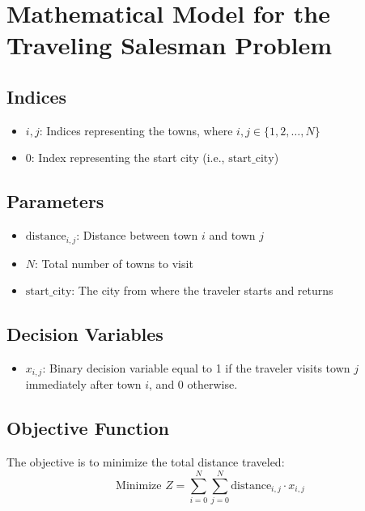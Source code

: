 \documentclass{article}
\begin{document}
\section*{Mathematical Model for the Traveling Salesman Problem}

\subsection*{Indices}
\begin{itemize}
    \item \( i, j \): Indices representing the towns, where \( i, j \in \{1, 2, \ldots, N\} \)
    \item \( 0 \): Index representing the start city (i.e., \( \text{start\_city} \))
\end{itemize}

\subsection*{Parameters}
\begin{itemize}
    \item \( \text{distance}_{i,j} \): Distance between town \( i \) and town \( j \)
    \item \( N \): Total number of towns to visit
    \item \( \text{start\_city} \): The city from where the traveler starts and returns
\end{itemize}

\subsection*{Decision Variables}
\begin{itemize}
    \item \( x_{i,j} \): Binary decision variable equal to 1 if the traveler visits town \( j \) immediately after town \( i \), and 0 otherwise.
\end{itemize}

\subsection*{Objective Function}
The objective is to minimize the total distance traveled:
\[
\text{Minimize } Z = \sum_{i=0}^{N} \sum_{j=0}^{N} \text{distance}_{i,j} \cdot x_{i,j}
\]
\end{document}
